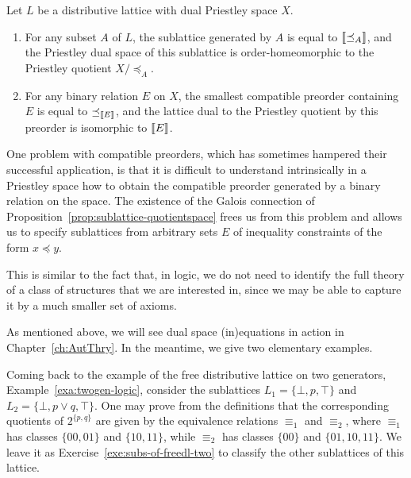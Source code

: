 \begin{theorem}\label{thrm:sublatices-inequations}
  Let $L$ be a distributive lattice with dual Priestley space $X$.
  \begin{enumerate}
  \item For any subset $A$ of $L$, the sublattice generated by $A$ is equal to $\llbracket {\preceq_A} \rrbracket$, and the Priestley dual space of this sublattice is order-homeomorphic to the Priestley quotient $X/{\preceq_A }$.
  \item For any binary relation $E$ on $X$, the smallest compatible preorder containing $E$ is equal to $\preceq_{\llbracket {E} \rrbracket}$, and the lattice dual to the Priestley quotient by this preorder is isomorphic to $\llbracket {E} \rrbracket$.
  \end{enumerate}
\end{theorem}

\begin{remark}\label{rem:inequations}
One problem with compatible preorders, which has sometimes hampered their successful application, is that it is difficult to understand intrinsically in a Priestley space how to obtain the compatible preorder generated by a binary relation on the space. The existence of the Galois connection of Proposition~\ref{prop:sublattice-quotientspace} frees us from this problem and allows us to specify sublattices from arbitrary sets $E$ of inequality constraints of the form $x\preceq y$. 

This is similar to the fact that, in logic, we do not need to identify the full theory of a class of structures that we are interested in, since we may be able to capture it by a much smaller set of axioms.
\end{remark}

As mentioned above, we will see dual space (in)equations in action in Chapter~\ref{ch:AutThry}. In the meantime, we give two elementary examples.

\begin{example}\label{exa:sub-of-free}
Coming back to the example of the free distributive lattice on two generators, Example~\ref{exa:twogen-logic}, consider the sublattices $L_1 = \{\bot, p, \top\}$ and $L_2 = \{\bot, p \vee q, \top\}$. One may prove from the definitions that the corresponding quotients of $2^{\{p,q\}}$ are given by the equivalence relations $\equiv_1$ and $\equiv_2$, where $\equiv_1$ has classes $\{00, 01\}$ and $\{10,11\}$, while $\equiv_2$ has classes $\{00\}$ and $\{01,10,11\}$. We leave it as Exercise~\ref{exe:subs-of-freedl-two} to classify the other sublattices of this lattice.
\end{example}

